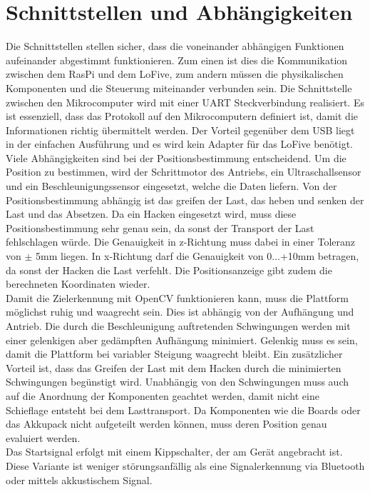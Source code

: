 \documentclass[a4paper]{report}
\begin{document}
\section{Schnittstellen und Abhängigkeiten}
\label{sec:SchnittAbhang}
Die Schnittstellen stellen sicher, dass die voneinander abhängigen Funktionen aufeinander abgestimmt funktionieren. Zum einen ist dies die Kommunikation zwischen dem RasPi und dem LoFive, zum andern müssen die physikalischen Komponenten und die Steuerung miteinander verbunden sein. Die Schnittstelle zwischen den Mikrocomputer wird mit einer UART Steckverbindung realisiert. Es ist essenziell, dass das Protokoll auf den Mikrocomputern definiert ist, damit die Informationen richtig übermittelt werden. Der Vorteil gegenüber dem USB liegt in der einfachen Ausführung und es wird kein Adapter für das LoFive benötigt.\\
Viele Abhängigkeiten sind bei der Positionsbestimmung entscheidend. Um die Position zu bestimmen, wird der Schrittmotor des Antriebs, ein Ultraschallsensor und ein Beschleunigungssensor eingesetzt, welche die Daten liefern. Von der Positionsbestimmung abhängig ist das greifen der Last, das heben und senken der Last und das Absetzen. Da ein Hacken eingesetzt wird, muss diese Positionsbestimmung sehr genau sein, da sonst der Transport der Last fehlschlagen würde. Die Genauigkeit in z-Richtung muss dabei in einer Toleranz von $\pm$ 5mm liegen. In x-Richtung darf die Genauigkeit von 0...+10mm betragen, da sonst der Hacken die Last verfehlt. Die Positionsanzeige gibt zudem die berechneten Koordinaten wieder.\\
Damit die Zielerkennung mit OpenCV funktionieren kann, muss die Plattform möglichst ruhig und waagrecht sein. Dies ist abhängig von der Aufhängung und Antrieb. Die durch die Beschleunigung auftretenden Schwingungen werden mit einer gelenkigen aber gedämpften Aufhängung minimiert. Gelenkig muss es sein, damit die Plattform bei variabler Steigung waagrecht bleibt. Ein zusätzlicher Vorteil ist, dass das Greifen der Last mit dem Hacken durch die minimierten Schwingungen begünstigt wird. Unabhängig von den Schwingungen muss auch auf die Anordnung der Komponenten geachtet werden, damit nicht eine Schieflage entsteht bei dem Lasttransport. Da Komponenten wie die Boards oder das Akkupack nicht aufgeteilt werden können, muss deren Position genau evaluiert werden.\\
Das Startsignal erfolgt mit einem Kippschalter, der am Gerät angebracht ist. Diese Variante ist weniger störungsanfällig als eine Signalerkennung via Bluetooth oder mittels akkustischem Signal.
\end{document}
